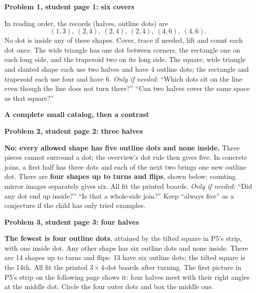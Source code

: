 \documentclass[11pt]{article}
\newcommand{\head}[1]{\par\textbf{\large #1}\par}
\newcommand{\sub}[1]{\par\textbf{#1}\par}
\newcommand{\hint}[1]{\textit{Only if needed:} #1}
\newcommand{\dotgrid}[2]{\foreach \x in {0,...,#1}{\foreach \y in {0,...,#2}{\fill (\x,\y) circle (1.25pt);}}}
\begin{document}
\sub{Problem 1, student page 1: six covers}
In reading order, the records (halves, outline dots) are
\[
(1,3),\ (2,4),\ (2,4),\ (2,4),\ (4,6),\ (4,6).
\]
No dot is inside any of these shapes. Cover, trace if needed, lift and count each dot once. The wide triangle has one dot between corners, the rectangle one on each long side, and the trapezoid two on its long side. The square, wide triangle and slanted shape each use two halves and have 4 outline dots; the rectangle and trapezoid each use four and have 6. \hint{``Which dots sit on the line even though the line does not turn there?'' ``Can two halves cover the same space as that square?''}

\newpage
\head{A complete small catalog, then a contrast}
\sub{Problem 2, student page 2: three halves}
\textbf{No: every allowed shape has five outline dots and none inside.} Three pieces cannot surround a dot; the overview's dot rule then gives five. In concrete joins, a first half has three dots and each of the next two brings one new outline dot. There are \textbf{four shapes up to turns and flips}, shown below; counting mirror images separately gives six. All fit the printed boards. \hint{``Did any dot end up inside?'' ``Is that a whole-side join?''} Keep ``always five'' as a conjecture if the child has only tried examples.
\begin{center}
\end{center}
\sub{Problem 3, student page 3: four halves}
\textbf{The fewest is four outline dots}, attained by the tilted square in P5's strip, with one inside dot. Any other shape has six outline dots and none inside. There are 14 shapes up to turns and flips: 13 have six outline dots; the tilted square is the 14th. All fit the printed $3\times4$-dot boards after turning.
The first picture in P5's strip on the following page shows it: four halves meet with their right angles at the middle dot. Circle the four outer dots and box the middle one.
\end{document}
